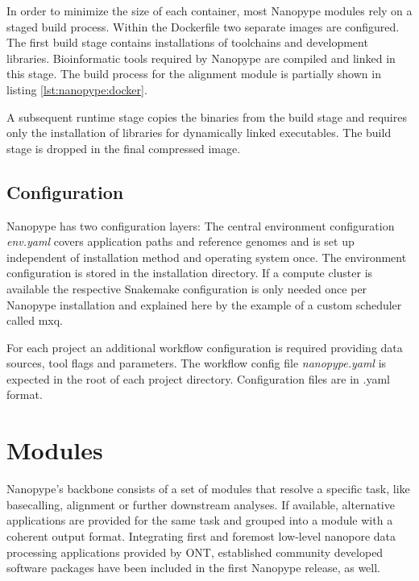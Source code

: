 In order to minimize the size of each container, most Nanopype modules rely on a staged build process. Within the Dockerfile two separate images are configured. The first build stage contains installations of toolchains and development libraries. Bioinformatic tools required by Nanopype are compiled and linked in this stage. The build process for the alignment module is partially shown in listing \ref{lst:nanopype:docker}.



A subsequent runtime stage copies the binaries from the build stage and requires only the installation of libraries for dynamically linked executables. The build stage is dropped in the final compressed image.


\subsection{Configuration}

Nanopype has two configuration layers: The central environment configuration \textit{env.yaml} covers application paths and reference genomes and is set up independent of installation method and operating system once. The environment configuration is stored in the installation directory. If a compute cluster is available the respective Snakemake configuration is only needed once per Nanopype installation and explained here by the example of a custom scheduler called mxq.

For each project an additional workflow configuration is required providing data sources, tool flags and parameters. The workflow config file \textit{nanopype.yaml} is expected in the root of each project directory. Configuration files are in .yaml format.






\section{Modules}
\label{sec:nanopype:modules}
Nanopype’s backbone consists of a set of modules that resolve a specific task, like basecalling, alignment or further downstream analyses. If available, alternative applications are provided for the same task and grouped into a module with a coherent output format. Integrating first and foremost low-level nanopore data processing applications provided by ONT, established community developed software packages have been included in the first Nanopype release, as well.


